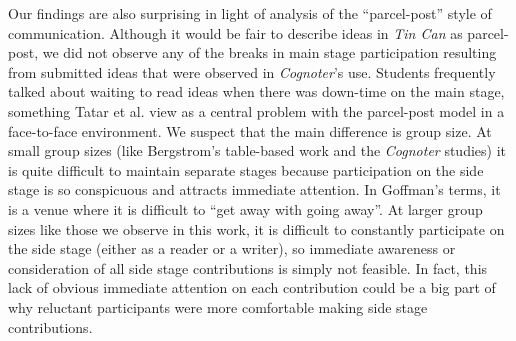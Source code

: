 Our findings are also surprising in light of \citet{Tatar:1991jq} analysis of the ``parcel-post'' style of communication. Although it would be fair to describe ideas in \emph{Tin Can} as parcel-post, we did not observe any of the breaks in main stage participation resulting from submitted ideas that were observed in \emph{Cognoter}'s use. Students frequently talked about waiting to read ideas when there was down-time on the main stage, something Tatar et al. view as a central problem with the parcel-post model in a face-to-face environment. We suspect that the main difference is group size. At small group sizes (like Bergstrom's table-based work and the \emph{Cognoter} studies) it is quite difficult to maintain separate stages because participation on the side stage is so conspicuous and attracts immediate attention. In Goffman's terms, it is a venue where it is difficult to ``get away with going away''. At larger group sizes like those we observe in this work, it is difficult to constantly participate on the side stage (either as a reader or a writer), so immediate awareness or consideration of all side stage contributions is simply not feasible. In fact, this lack of obvious immediate attention on each contribution could be a big part of why reluctant participants were more comfortable making side stage contributions. 





